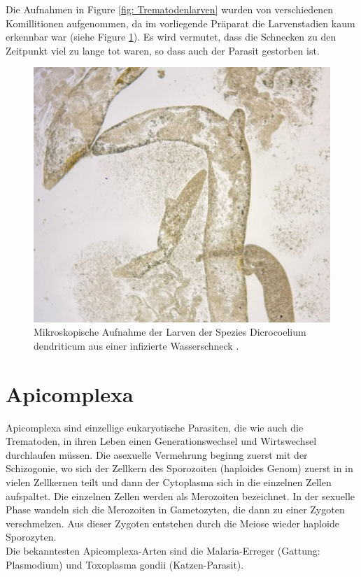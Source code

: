 \documentclass[oneside,10pt,a4paper]{report}
\begin{document}
				Die Aufnahmen in Figure \ref{fig: Trematodenlarven} wurden von verschiedenen Komillitionen aufgenommen, da im vorliegende Präparat die Larvenstadien kaum erkennbar war (siehe Figure \ref{fig: crapTrematodenlarven}). Es wird vermutet, dass die Schnecken zu den Zeitpunkt viel zu lange tot waren, so dass auch der Parasit gestorben ist.
				
				\begin{figure}[H]
					\centering
					\includegraphics[scale=0.5]{Trematodenlarven.jpg}
					\caption{Mikroskopische Aufnahme der Larven der Spezies Dicrocoelium dendriticum aus einer infizierte Wasserschneck .}
					\label{fig: crapTrematodenlarven}
				\end{figure}
	
	\chapter{Apicomplexa}
		Apicomplexa sind einzellige eukaryotische Parasiten, die wie auch die Trematoden, in ihren Leben einen Generationswechsel und Wirtswechsel durchlaufen müssen.
		Die asexuelle Vermehrung beginng zuerst mit der Schizogonie, wo sich der Zellkern des Sporozoiten (haploides Genom) zuerst in in vielen Zellkernen teilt und dann der Cytoplasma sich in die einzelnen Zellen aufspaltet. Die einzelnen Zellen werden als Merozoiten bezeichnet. In der sexuelle Phase wandeln sich die Merozoiten in Gametozyten, die dann zu einer Zygoten verschmelzen. Aus dieser Zygoten entstehen durch die Meiose wieder haploide Sporozyten.\\
		Die bekanntesten Apicomplexa-Arten sind die Malaria-Erreger (Gattung: Plasmodium) und Toxoplasma gondii (Katzen-Parasit)\cite{wiki_apicomplexa}.
		
\end{document}
